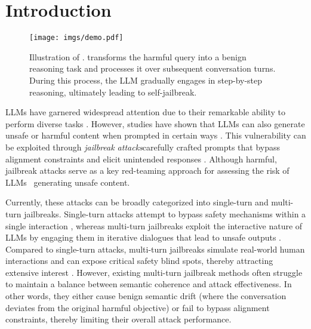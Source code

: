 \section{Introduction}
\begin{figure}[h] 
    \centering 
    \texttt{[image: imgs/demo.pdf]} 
    \caption{Illustration of \method{}. \method{} transforms the harmful query into a benign reasoning task and processes it over subsequent conversation turns. During this process, the LLM gradually engages in step-by-step reasoning, ultimately leading to self-jailbreak.}
    \label{fig:compare} 
\end{figure}

LLMs have garnered widespread attention due to their remarkable ability to perform diverse tasks \cite{llm1,llm2,llm3}. However, studies have shown that LLMs can also generate unsafe or harmful content when prompted in certain ways \cite{recent1,recent2,recent3}. This vulnerability can be exploited through \emph{jailbreak attacks}\textemdash carefully crafted prompts that bypass alignment constraints and elicit unintended responses \cite{gcg,autodan,nba,dlp}. Although harmful, jailbreak attacks \cite{gcg,bap, li2024semantic, ying2024jailbreak, zhang2024lanevil} serve as a key red-teaming approach for assessing the risk of LLMs~\cite{liang2024vl, liang2024revisiting, liang2023badclip} generating unsafe content.

Currently, these attacks can be broadly categorized into single-turn and multi-turn jailbreaks. Single-turn attacks attempt to bypass safety mechanisms within a single interaction \cite{gcg,autodan,lapid2023open,psy,psy1,psy2}, whereas multi-turn jailbreaks exploit the interactive nature of LLMs by engaging them in iterative dialogues that lead to unsafe outputs \cite{mpsy2,mutliattack2,mpsy1,mutliattack5}. Compared to single-turn attacks, multi-turn jailbreaks simulate real-world human interactions and can expose critical safety blind spots, thereby attracting extensive interest \cite{mutliattack2,mutliattack5}. However, existing multi-turn jailbreak methods often struggle to maintain a balance between semantic coherence and attack effectiveness. In other words, they either cause benign semantic drift (where the conversation deviates from the original harmful objective) or fail to bypass alignment constraints, thereby limiting their overall attack performance.

